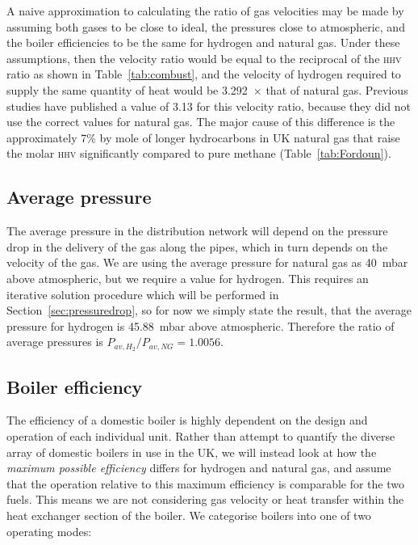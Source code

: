 \documentclass[5p]{elsarticle} %
\begin{document}
A naive approximation to calculating the ratio of gas velocities may be made by assuming both gases to be close to ideal, the pressures close to atmospheric, and the boiler efficiencies to be the same for hydrogen and natural gas.
Under these assumptions, then the velocity ratio would be equal to the reciprocal of the \textsc{hhv} ratio as shown in Table~\ref{tab:combust}, and the velocity of hydrogen required to supply the same quantity of  heat would be 3.292~$\times$  that of natural gas. 
Previous studies have published a value of 3.13 for this velocity ratio, because they did not use the correct values for natural gas\citep{dodds2013,bossel2006}. 
The major cause of this difference is the approximately 7\% by mole of longer hydrocarbons in UK natural gas that raise the molar \textsc{hhv} significantly compared to pure methane (Table~\ref{tab:Fordoun}).

\subsection{Average pressure}
\label{sec:avpressure}

The average pressure in the distribution network will depend on the pressure drop in the delivery of the gas along the pipes, which in turn depends on the velocity of the gas.
We are using the average pressure for natural gas as 40~mbar above atmospheric\citep{utonomy23}, but we require a value for hydrogen. 
This requires an iterative solution procedure which will be performed in Section~\ref{sec:pressuredrop}, so for now we simply state the result, that the average pressure for hydrogen is 45.88~mbar above atmospheric.
Therefore the ratio of average pressures is ${P_{av,H_2}}/{P_{av,NG}} = 1.0056$.

\subsection{Boiler efficiency}
\label{sec:efficiency}

The efficiency of a domestic boiler is highly dependent on the design and operation of each individual unit. 
Rather than attempt to quantify the diverse array of domestic boilers  in use in the UK, we will instead look at how the \emph{maximum possible efficiency} differs for hydrogen and natural gas, and assume that the operation relative to this maximum efficiency is comparable for the two fuels.
This means we are not considering gas velocity or heat transfer within the heat exchanger section of the boiler.
We categorise boilers into one of two 
operating modes:
\end{document}
